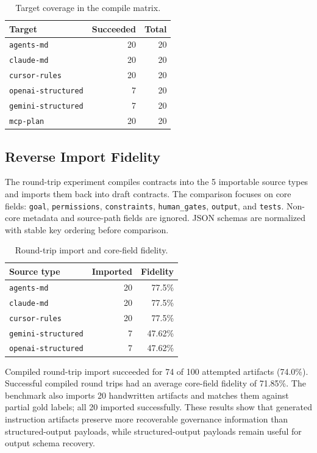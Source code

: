 \documentclass[10pt,conference]{IEEEtran}
\begin{document}
\begin{table}[t]
\caption{Target coverage in the compile matrix.}
\label{tab:compile}
\centering
\begin{tabular}{lrr}
\toprule
Target & Succeeded & Total \\
\midrule
\texttt{agents-md} & 20 & 20 \\
\texttt{claude-md} & 20 & 20 \\
\texttt{cursor-rules} & 20 & 20 \\
\texttt{openai-structured} & 7 & 20 \\
\texttt{gemini-structured} & 7 & 20 \\
\texttt{mcp-plan} & 20 & 20 \\
\bottomrule
\end{tabular}
\end{table}

\subsection{Reverse Import Fidelity}

The round-trip experiment compiles contracts into the 5 importable source types and
imports them back into draft contracts. The comparison focuses on core fields:
\texttt{goal}, \texttt{permissions}, \texttt{constraints}, \texttt{human\_gates},
\texttt{output}, and \texttt{tests}. Non-core metadata and source-path fields are
ignored. JSON schemas are normalized with stable key ordering before comparison.

\begin{table}[t]
\caption{Round-trip import and core-field fidelity.}
\label{tab:roundtrip}
\centering
\begin{tabular}{lrr}
\toprule
Source type & Imported & Fidelity \\
\midrule
\texttt{agents-md} & 20 & 77.5\% \\
\texttt{claude-md} & 20 & 77.5\% \\
\texttt{cursor-rules} & 20 & 77.5\% \\
\texttt{gemini-structured} & 7 & 47.62\% \\
\texttt{openai-structured} & 7 & 47.62\% \\
\bottomrule
\end{tabular}
\end{table}

Compiled round-trip import succeeded for 74 of 100 attempted artifacts (74.0\%).
Successful compiled round trips had an average core-field fidelity of 71.85\%. The
benchmark also imports 20 handwritten artifacts and matches them against partial gold
labels; all 20 imported successfully. These results show that generated instruction
artifacts preserve more recoverable governance information than structured-output
payloads, while structured-output payloads remain useful for output schema recovery.
\end{document}
